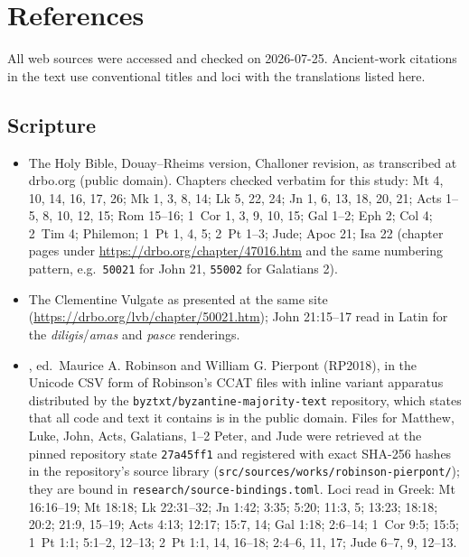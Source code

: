 \section{References}

\begingroup
\raggedright

All web sources were accessed and checked on 2026-07-25. Ancient-work
citations in the text use conventional titles and loci with the
translations listed here.

\subsection*{Scripture}

\begin{itemize}
\item The Holy Bible, Douay--Rheims version, Challoner revision, as
transcribed at drbo.org (public domain). Chapters checked verbatim for
this study: Mt 4, 10, 14, 16, 17, 26; Mk 1, 3, 8, 14; Lk 5, 22, 24; Jn 1, 6,
13, 18, 20, 21; Acts 1--5, 8, 10, 12, 15; Rom 15--16; 1~Cor 1, 3, 9, 10, 15;
Gal 1--2; Eph 2; Col 4; 2~Tim 4; Philemon; 1~Pt 1, 4, 5; 2~Pt 1--3; Jude;
Apoc 21; Isa 22 (chapter pages under
\url{https://drbo.org/chapter/47016.htm} and the same numbering pattern,
e.g.\ \texttt{50021} for John 21, \texttt{55002} for Galatians 2).
\item The Clementine Vulgate as presented at the same site
(\url{https://drbo.org/lvb/chapter/50021.htm}); John 21:15--17 read in Latin
for the \textit{diligis}/\textit{amas} and \textit{pasce} renderings.
\item {},
ed.\ Maurice A. Robinson and William G. Pierpont (RP2018), in the Unicode
CSV form of Robinson's CCAT files with inline variant apparatus distributed
by the \texttt{byztxt/byzantine-majority-text} repository, which states that
all code and text it contains is in the public domain. Files for Matthew,
Luke, John, Acts, Galatians, 1--2 Peter, and Jude were retrieved at the
pinned repository state \texttt{27a45ff1} and registered with exact SHA-256
hashes in the repository's source library
(\texttt{src/sources/works/robinson-pierpont/}); they are bound in
\texttt{research/source-bindings.toml}. Loci read in Greek: Mt 16:16--19;
Mt 18:18; Lk 22:31--32; Jn 1:42; 3:35; 5:20; 11:3, 5; 13:23; 18:18;
20:2; 21:9, 15--19; Acts 4:13; 12:17; 15:7, 14; Gal 1:18; 2:6--14;
1~Cor 9:5; 15:5; 1~Pt 1:1; 5:1--2, 12--13; 2~Pt 1:1, 14, 16--18; 2:4--6,
11, 17; Jude 6--7, 9, 12--13.
\end{itemize}

